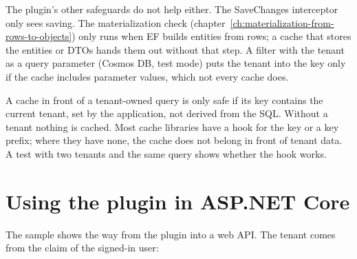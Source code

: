 The plugin's other safeguards do not help either. The SaveChanges interceptor only sees
saving. The materialization check (chapter~\ref{ch:materialization-from-rows-to-objects})
only runs when EF builds entities from rows; a cache that stores the entities or DTOs hands
them out without that step. A filter with the tenant as a query parameter (Cosmos DB, test
mode) puts the tenant into the key only if the cache includes parameter values, which not
every cache does.

\begin{important}
  A cache in front of a tenant-owned query is only safe if its key contains the current
  tenant, set by the application, not derived from the SQL. Without a tenant nothing is cached.
  Most cache libraries have a hook for the key or a key prefix; where they have none, the cache
  does not belong in front of tenant data. A test with two tenants and the same query shows
  whether the hook works.
\end{important}


\chapter{Using the plugin in ASP.NET Core}\label{ch:using-the-plugin-in-asp}

The sample  shows the way from the plugin
into a web API. The tenant comes from the claim  of the
signed-in user:

